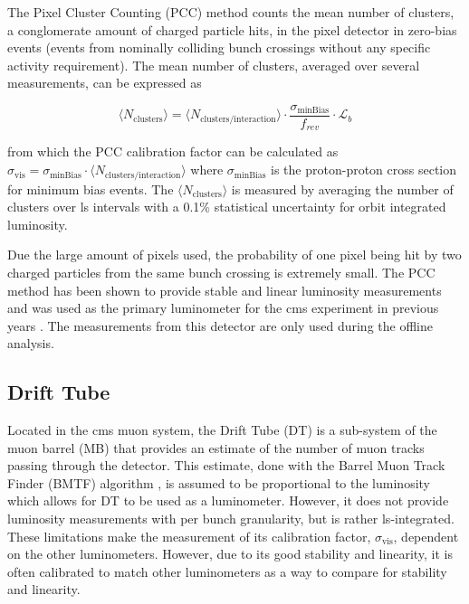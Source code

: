 The Pixel Cluster Counting (PCC) method counts the mean number of clusters, a conglomerate amount of charged particle hits, in the pixel detector in zero-bias events (events from nominally colliding bunch crossings without any specific activity requirement). The mean number of clusters, averaged over several measurements, can be expressed as

\begin{equation}
	\label{eq:pcc-clusters-mean}
	\langle N_{\text{clusters}} \rangle = \langle N_{\text{clusters} / \text{interaction}} \rangle \cdot \frac{\sigma_{\text{minBias}}}{f_{rev}} \cdot \mathcal{L}_b
\end{equation}

from which the PCC calibration factor can be calculated as $\sigma_{\text{vis}} = \sigma_{\text{minBias}} \cdot \langle N_{\text{clusters} / \text{interaction}} \rangle$ where $\sigma_{\text{minBias}}$ is the proton-proton cross section for minimum bias events. The $\langle N_{\text{clusters}} \rangle$ is measured by averaging the number of clusters over \acrshort{ls} intervals with a 0.1\% statistical uncertainty for orbit integrated luminosity.

Due the large amount of pixels used, the probability of one pixel being hit by two charged particles from the same bunch crossing is extremely small. The PCC method has been shown to provide stable and linear luminosity measurements and was used as the primary luminometer for the \acrshort{cms} experiment in previous years \cite{Sirunyan:2759951}. The measurements from this detector are only used during the offline analysis. 

\subsection{Drift Tube}
\label{subsec:dt}

Located in the \acrshort{cms} muon system, the Drift Tube (DT) is a sub-system of the muon barrel (MB) that provides an estimate of the number of muon tracks passing through the detector. This estimate, done with the Barrel Muon Track Finder (BMTF) algorithm \cite{Triossi_2017}, is assumed to be proportional to the luminosity which allows for DT to be used as a luminometer. However, it does not provide luminosity measurements with per bunch granularity, but is rather \acrshort{ls}-integrated. These limitations make the measurement of its calibration factor, $\sigma_{\text{vis}}$, dependent on the other luminometers. However, due to its good stability and linearity, it is often calibrated to match other luminometers as a way to compare for stability and linearity.

